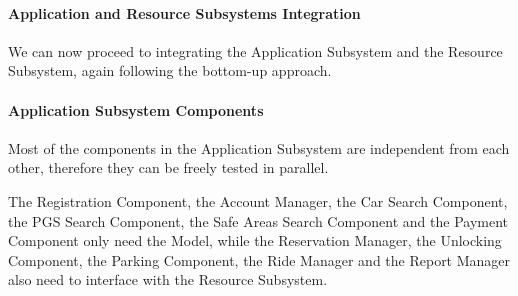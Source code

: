 \documentclass[english]{article}
\begin{document}
\paragraph{Application and Resource Subsystems Integration}
We can now proceed to integrating the Application Subsystem and the Resource Subsystem, again following the bottom-up approach.
\begin{figure}[H]
	\centering
\end{figure}

\paragraph{Application Subsystem Components}
Most of the components in the Application Subsystem are independent from each other, therefore they can be freely tested in parallel.

The Registration Component, the Account Manager, the Car Search Component, the PGS Search Component, the Safe Areas Search Component and the Payment Component only need the Model, while the Reservation Manager, the Unlocking Component, the Parking Component, the Ride Manager and the Report Manager also need to interface with the Resource Subsystem.
\end{document}
